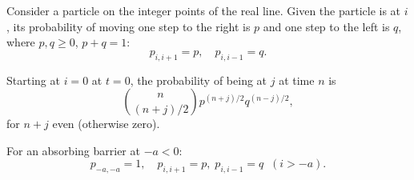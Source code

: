 Consider a particle on the integer points of the real line. Given the particle is at $i$, its probability of moving one step to the right is $p$ and one step to the left is $q$, where $p, q \geq 0$, $p+q=1$:
$$p_{i,i+1} = p, \quad p_{i,i-1} = q.$$

Starting at $i=0$ at $t=0$, the probability of being at $j$ at time $n$ is
$$\binom{n}{(n+j)/2} p^{(n+j)/2} q^{(n-j)/2},$$
for $n+j$ even (otherwise zero).

For an absorbing barrier at $-a < 0$:
$$p_{-a,-a} = 1, \quad p_{i,i+1} = p, \; p_{i,i-1} = q \;\; (i > -a).$$
